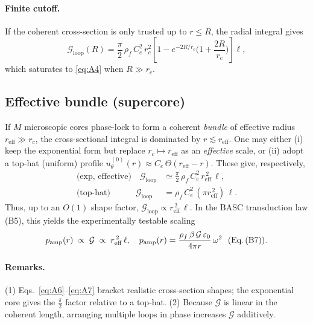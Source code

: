 \documentclass[10pt,reprint,aps,onecolumn,nofootinbib]{revtex4-2}
\begin{document}
    \paragraph{Finite cutoff.}
        If the coherent cross-section is only trusted up to $r\le R$, the radial integral gives
        \begin{equation}
            \mathcal{G}_{\text{loop}}(R)
            =\frac{\pi}{2}\,\rho_f\,C_e^2\,r_c^2\!\left[1-e^{-2R/r_c}\!\Big(1+\frac{2R}{r_c}\Big)\right]\ell,
            \label{eq:A5}
        \end{equation}
        which saturates to \eqref{eq:A4} when $R\!\gg\! r_c$.

    \subsection*{Effective bundle (supercore)}
    If $M$ microscopic cores phase-lock to form a coherent \emph{bundle} of effective radius $r_{\mathrm{eff}}\gg r_c$, the cross-sectional integral is dominated by $r\lesssim r_{\mathrm{eff}}$. One may either (i) keep the exponential form but replace $r_c\mapsto r_{\mathrm{eff}}$ as an \emph{effective} scale, or (ii) adopt a top-hat (uniform) profile $u_\theta^{(0)}(r)\approx C_e\,\Theta(r_{\mathrm{eff}}-r)$. These give, respectively,
    \begin{align}
        \text{(exp, effective)}\quad
        \mathcal{G}_{\text{loop}}
        &\simeq \frac{\pi}{2}\,\rho_f\,C_e^2\,r_{\mathrm{eff}}^{\,2}\,\ell,
        \label{eq:A6}\\
        \text{(top-hat)}\qquad\quad
        \mathcal{G}_{\text{loop}}
        &= \rho_f\,C_e^2\,(\pi r_{\mathrm{eff}}^{\,2})\,\ell.
        \label{eq:A7}
    \end{align}
    Thus, up to an $O(1)$ shape factor, \emph{$\mathcal{G}_{\text{loop}}\propto r_{\mathrm{eff}}^{\,2}\,\ell$}. In the BASC transduction law (B5), this yields the experimentally testable scaling
    \begin{equation}
        p_{\mathrm{amp}}(r)\;\propto\;\mathcal{G}\;\propto\;r_{\mathrm{eff}}^{\,2}\,\ell,
        \quad
        p_{\mathrm{amp}}(r)=\frac{\rho_f\,\beta\,\mathcal{G}\,\varepsilon_0}{4\pi r}\,\omega^2
        \ \ \text{(Eq.\,(B7))}.
        \label{eq:A8}
    \end{equation}

    \paragraph{Remarks.}
    (1) Eqs.~\eqref{eq:A6}–\eqref{eq:A7} bracket realistic cross-section shapes; the exponential core gives the $\tfrac{\pi}{2}$ factor relative to a top-hat. (2) Because $\mathcal{G}$ is linear in the coherent length, arranging multiple loops in phase increases $\mathcal{G}$ additively.
\end{document}
